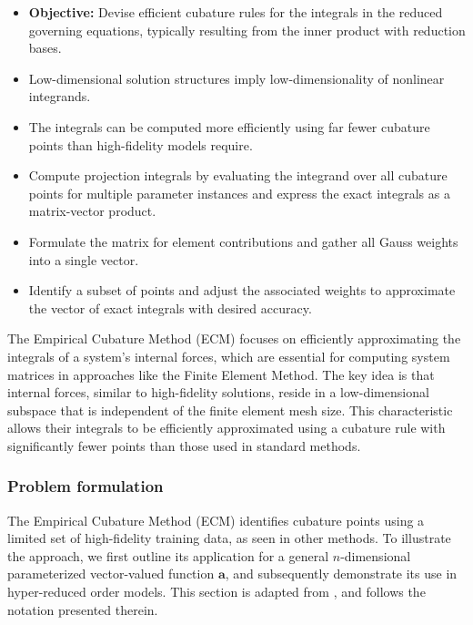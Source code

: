 \documentclass[11pt]{article}
\renewcommand{\vec}[1]{\mathbf{#1}}
\begin{document}
            \noindent\hrulefill
            \begin{itemize}
                    \item \textbf{Objective:} Devise efficient cubature rules for the integrals in the reduced governing equations, typically resulting from the inner product with reduction bases.
                    \item Low-dimensional solution structures imply low-dimensionality of nonlinear integrands.
                    \item The integrals can be computed more efficiently using far fewer cubature points than high-fidelity models require.
                    \item Compute projection integrals by evaluating the integrand over all cubature points for multiple parameter instances and express the exact integrals as a matrix-vector product.
                    \item Formulate the matrix for element contributions and gather all Gauss weights into a single vector.
                    \item Identify a subset of points and adjust the associated weights to approximate the vector of exact integrals with desired accuracy.
            \end{itemize}
            \noindent\hrulefill


            The Empirical Cubature Method (ECM) \cite{hernandez2017dimensional} focuses on efficiently approximating the integrals of a system's internal forces, which are essential for computing system matrices in approaches like the Finite Element Method.
            The key idea is that internal forces, similar to high-fidelity solutions, reside in a low-dimensional subspace that is independent of the finite element mesh size.
            This characteristic allows their integrals to be efficiently approximated using a cubature rule with significantly fewer points than those used in standard methods.


            \subsubsection*{Problem formulation}
            The Empirical Cubature Method (ECM) identifies cubature points using a limited set of high-fidelity training data, as seen in other methods.
            To illustrate the approach, we first outline its application for a general \( n \)-dimensional parameterized vector-valued function \( \vec{a} \), and subsequently demonstrate its use in hyper-reduced order models.
            This section is adapted from \cite{hernandez2024cecm}, and follows the notation presented therein.
\end{document}
